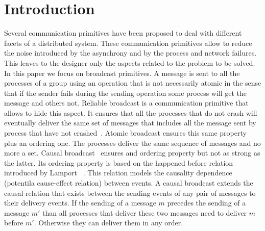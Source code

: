 
\section{Introduction}

Several communication primitives have been proposed to deal with different facets of a distributed system. These communication primitives allow to reduce the noise introduced by the asynchrony and by the process and network failures. This leaves to the designer only the aspects related to the problem to be solved. In this paper we focus on broadcast primitives. A message is sent to all the processes of a group using an operation that is not necessarily atomic in the sense that if the sender fails during the sending operation some process will get the message and others not. Reliable broadcast is a communication primitive that allows to hide this aspect. It ensures that all the processes that do not crash will eventually deliver the same set of messages that includes all the message sent by process that have not crashed~\cite{hadzilacos1994modular}. Atomic broadcast ensures this same property plus an ordering one. The processes deliver the same sequence of messages and no more a set. 
Causal broadcast~\cite{birman1987reliable} ensures and ordering property but not as strong as the latter. Its ordering property is based on the happened before relation introduced by Lamport ~\cite{lamport1978time,schwarz1994detecting}. This relation models the causality dependence (potentila cause-effect relation) between events. A causal broadcast extends the causal relation that exists between the sending events of any pair of messages to their delivery events. If the sending of a message $m$ precedes the sending of a message $m'$ than all processes that deliver these two messages need to deliver $m$ before $m'$. Otherwise they can deliver them in any order.


